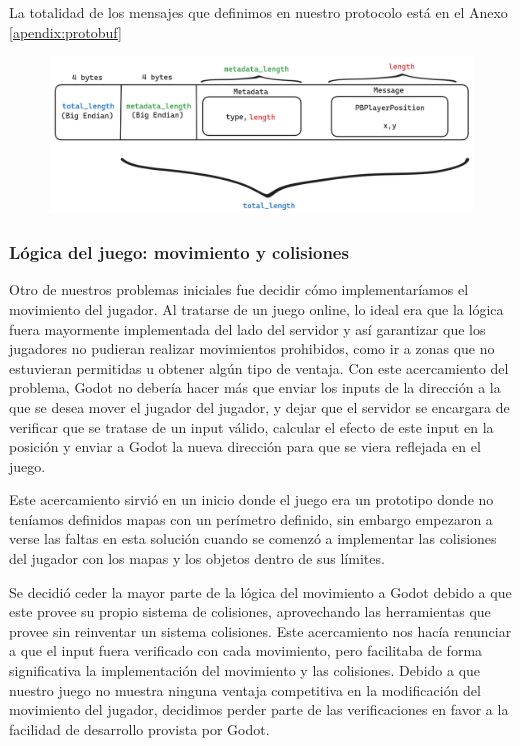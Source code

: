 La totalidad de los mensajes que definimos en nuestro protocolo está en el Anexo \ref{apendix:protobuf}

\begin{figure}[htbp]
    \centering
    \includegraphics[width=1.0\textwidth]{../assets/protobuf.png}
\end{figure}

\subsubsection{Lógica del juego: movimiento y colisiones}
\noindent Otro de nuestros problemas iniciales fue decidir cómo implementaríamos el movimiento del 
jugador. Al tratarse de un juego online, lo ideal era que la lógica fuera mayormente implementada del 
lado del servidor y así garantizar que los jugadores no pudieran realizar movimientos prohibidos, como 
ir a zonas que no estuvieran permitidas u obtener algún tipo de ventaja. Con este acercamiento del 
problema, Godot no debería hacer más que enviar los inputs de la dirección a la que se desea mover el 
jugador del jugador, y dejar que el 
servidor se encargara de verificar que se tratase de un input válido, calcular el efecto de este 
input en la posición y enviar a Godot la nueva dirección para que se viera reflejada en el juego.

Este acercamiento sirvió en un inicio donde el juego era un prototipo donde no teníamos definidos 
mapas con un perímetro definido, sin embargo empezaron a verse las faltas en esta solución cuando 
se comenzó a implementar las colisiones del jugador con los mapas y los objetos dentro de sus límites.

Se decidió ceder la mayor parte de la lógica del movimiento a Godot debido a que este provee 
su propio sistema de colisiones, aprovechando las herramientas que provee sin reinventar un sistema 
colisiones. Este acercamiento nos hacía renunciar a que el input fuera 
verificado con cada movimiento, pero facilitaba de forma significativa la implementación del 
movimiento y las colisiones. Debido a que nuestro juego no muestra ninguna ventaja competitiva 
en la modificación del movimiento del jugador, decidimos perder parte de las verificaciones en 
favor a la facilidad de desarrollo provista por Godot.

